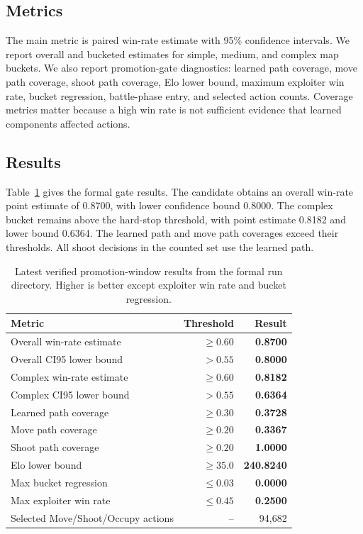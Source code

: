 \documentclass{article}
\begin{document}
\subsection{Metrics}

The main metric is paired win-rate estimate with 95\% confidence intervals. We report overall and bucketed estimates for simple, medium, and complex map buckets. We also report promotion-gate diagnostics: learned path coverage, move path coverage, shoot path coverage, Elo lower bound, maximum exploiter win rate, bucket regression, battle-phase entry, and selected action counts. Coverage metrics matter because a high win rate is not sufficient evidence that learned components affected actions.

\subsection{Results}

Table~\ref{tab:main-results} gives the formal gate results. The candidate obtains an overall win-rate point estimate of 0.8700, with lower confidence bound 0.8000. The complex bucket remains above the hard-stop threshold, with point estimate 0.8182 and lower bound 0.6364. The learned path and move path coverages exceed their thresholds. All shoot decisions in the counted set use the learned path.

\begin{table}[t]
  \centering
  \caption{Latest verified promotion-window results from the formal run directory. Higher is better except exploiter win rate and bucket regression.}
  \label{tab:main-results}
  \begin{tabular}{lrr}
    \toprule
    Metric & Threshold & Result \\
    \midrule
    Overall win-rate estimate & $\geq 0.60$ & \textbf{0.8700} \\
    Overall CI95 lower bound & $> 0.55$ & \textbf{0.8000} \\
    Complex win-rate estimate & $\geq 0.60$ & \textbf{0.8182} \\
    Complex CI95 lower bound & $> 0.55$ & \textbf{0.6364} \\
    Learned path coverage & $\geq 0.30$ & \textbf{0.3728} \\
    Move path coverage & $\geq 0.20$ & \textbf{0.3367} \\
    Shoot path coverage & $\geq 0.20$ & \textbf{1.0000} \\
    Elo lower bound & $\geq 35.0$ & \textbf{240.8240} \\
    Max bucket regression & $\leq 0.03$ & \textbf{0.0000} \\
    Max exploiter win rate & $\leq 0.45$ & \textbf{0.2500} \\
    Selected Move/Shoot/Occupy actions & -- & 94,682 \\
    \bottomrule
  \end{tabular}
\end{table}
\end{document}

